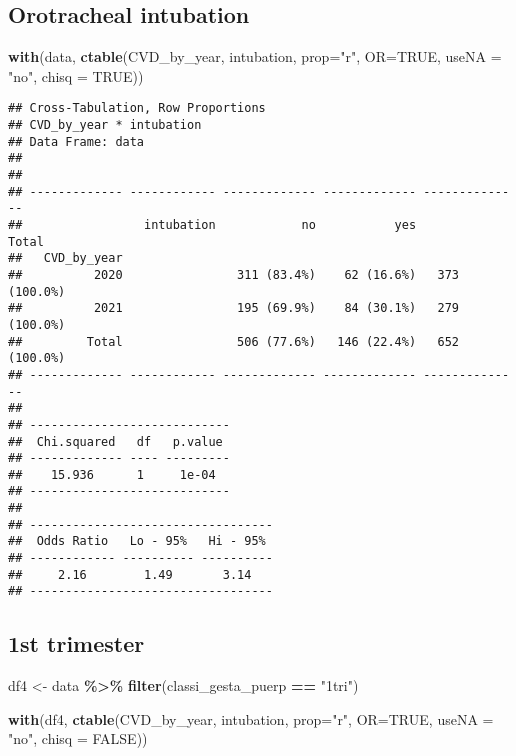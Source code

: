\documentclass[
]{article}
\newenvironment{Shaded}{\begin{snugshade}}{\end{snugshade}}
\newcommand{\AttributeTok}[1]{\textcolor[rgb]{0.13,0.29,0.53}{#1}}
\newcommand{\ConstantTok}[1]{\textcolor[rgb]{0.56,0.35,0.01}{#1}}
\newcommand{\FunctionTok}[1]{\textcolor[rgb]{0.13,0.29,0.53}{\textbf{#1}}}
\newcommand{\NormalTok}[1]{#1}
\newcommand{\OtherTok}[1]{\textcolor[rgb]{0.56,0.35,0.01}{#1}}
\newcommand{\SpecialCharTok}[1]{\textcolor[rgb]{0.81,0.36,0.00}{\textbf{#1}}}
\newcommand{\StringTok}[1]{\textcolor[rgb]{0.31,0.60,0.02}{#1}}
\begin{document}
\hypertarget{orotracheal-intubation}{%
\subsection{Orotracheal intubation}\label{orotracheal-intubation}}

\begin{Shaded}
\begin{Highlighting}[]
\FunctionTok{with}\NormalTok{(data, }\FunctionTok{ctable}\NormalTok{(CVD\_by\_year, intubation, }\AttributeTok{prop=}\StringTok{"r"}\NormalTok{, }\AttributeTok{OR=}\ConstantTok{TRUE}\NormalTok{, }\AttributeTok{useNA =} \StringTok{"no"}\NormalTok{, }\AttributeTok{chisq =} \ConstantTok{TRUE}\NormalTok{))}
\end{Highlighting}
\end{Shaded}

\begin{verbatim}
## Cross-Tabulation, Row Proportions  
## CVD_by_year * intubation  
## Data Frame: data  
## 
## 
## ------------- ------------ ------------- ------------- --------------
##                 intubation            no           yes          Total
##   CVD_by_year                                                        
##          2020                311 (83.4%)    62 (16.6%)   373 (100.0%)
##          2021                195 (69.9%)    84 (30.1%)   279 (100.0%)
##         Total                506 (77.6%)   146 (22.4%)   652 (100.0%)
## ------------- ------------ ------------- ------------- --------------
## 
## ----------------------------
##  Chi.squared   df   p.value 
## ------------- ---- ---------
##    15.936      1     1e-04  
## ----------------------------
## 
## ----------------------------------
##  Odds Ratio   Lo - 95%   Hi - 95% 
## ------------ ---------- ----------
##     2.16        1.49       3.14   
## ----------------------------------
\end{verbatim}

\hypertarget{st-trimester-7}{%
\subsection{1st trimester}\label{st-trimester-7}}

\begin{Shaded}
\begin{Highlighting}[]
\NormalTok{df4 }\OtherTok{\textless{}{-}}\NormalTok{ data }\SpecialCharTok{\%\textgreater{}\%} 
  \FunctionTok{filter}\NormalTok{(classi\_gesta\_puerp }\SpecialCharTok{==} \StringTok{"1tri"}\NormalTok{)}

\FunctionTok{with}\NormalTok{(df4, }\FunctionTok{ctable}\NormalTok{(CVD\_by\_year, intubation, }\AttributeTok{prop=}\StringTok{"r"}\NormalTok{, }\AttributeTok{OR=}\ConstantTok{TRUE}\NormalTok{, }\AttributeTok{useNA =} \StringTok{"no"}\NormalTok{, }\AttributeTok{chisq =} \ConstantTok{FALSE}\NormalTok{))}
\end{Highlighting}
\end{Shaded}
\end{document}

